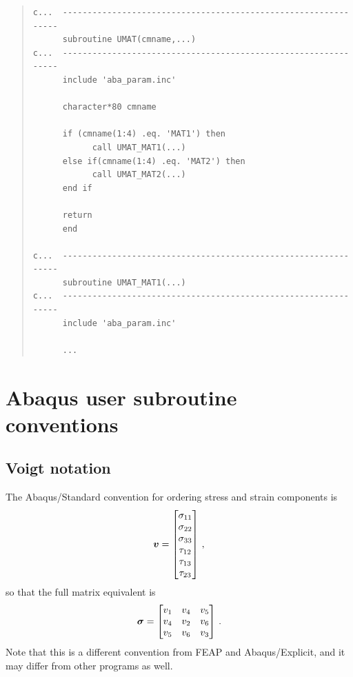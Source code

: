 \documentclass[10pt,letterpaper,oneside]{report}
\newcommand{\ten}[1]{\mbox{\boldmath $#1$}{}}
\begin{document}
\newpage
\begin{quote} \begin{lstlisting}
c...  ---------------------------------------------------------------
      subroutine UMAT(cmname,...)
c...  ---------------------------------------------------------------
      include 'aba_param.inc'
      
      character*80 cmname

      if (cmname(1:4) .eq. 'MAT1') then
            call UMAT_MAT1(...)
      else if(cmname(1:4) .eq. 'MAT2') then
            call UMAT_MAT2(...)
      end if

      return
      end

c...  ---------------------------------------------------------------
      subroutine UMAT_MAT1(...)
c...  ---------------------------------------------------------------
      include 'aba_param.inc'

      ...
\end{lstlisting} \end{quote}

\section{Abaqus user subroutine conventions}

\subsection{Voigt notation}
The Abaqus/Standard convention for ordering stress and strain components is
\begin{equation} \ten{v} = \begin{bmatrix}
\sigma_{11} \\ \sigma_{22} \\ \sigma_{33} \\
\tau_{12} \\ \tau_{13} \\ \tau_{23}
\end{bmatrix} \, , \end{equation} 
so that the full matrix equivalent is
\begin{equation} \ten{\sigma} = 
\begin{bmatrix}
v_1 & v_4 & v_5 \\
v_4 & v_2 & v_6 \\
v_5 & v_6 & v_3 
\end{bmatrix} \, . \end{equation} 
Note that this is a different convention from FEAP and Abaqus/Explicit, and it may differ from other programs as well.
\end{document}

